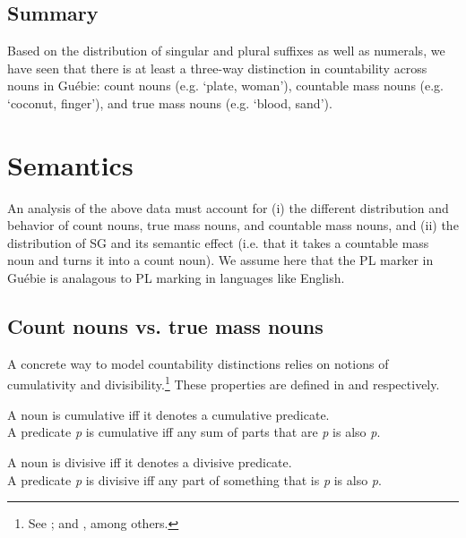 \documentclass[output=paper,colorlinks,citecolor=brown]{langscibook}
\begin{document}
\subsection{Summary}\label{sec:sande:2.4}

Based on the distribution of singular and plural suffixes as well as numerals, we have seen that there is at least a three-way distinction in countability across nouns in Guébie: count nouns (e.g. `plate, woman'), countable mass nouns (e.g. `coconut, finger'), and true mass nouns (e.g. `blood, sand').

\section{Semantics}\label{sec:sande:3}

An analysis of the above data must account for (i) the different distribution and behavior of count nouns, true mass nouns, and countable mass nouns, and (ii) the distribution of SG and its semantic effect (i.e. that it takes a countable mass noun and turns it into a count noun). We assume here that the PL marker in Guébie is analagous to PL marking in languages like English.

\subsection{Count nouns vs. true mass nouns}\label{sec:sande:3.1}

A concrete way to model countability distinctions relies on notions of cumulativity and divisibility.\footnote{See \citealt{Quine1960, Cheng1973, Link1983, Krifka1989, Doetjes1997, Grimm2012Diss}; and \citealt{Deal2017}, among others.} These properties are defined in   and  respectively.

\ea%
    \label{ex:sande:13}
    A noun is cumulative iff it denotes a cumulative predicate.\\
    A predicate \textit{p} is cumulative iff any sum of parts that are \textit{p} is also \textit{p}. \hfill{\citep[128]{Deal2017}}
\z

\ea%
    \label{ex:sande:14}
    A noun is divisive iff it denotes a divisive predicate.\\
    A predicate \textit{p} is divisive iff any part of something that is \textit{p} is also \textit{p}. \hfill{\citep[129]{Deal2017}}
\z
\end{document}

